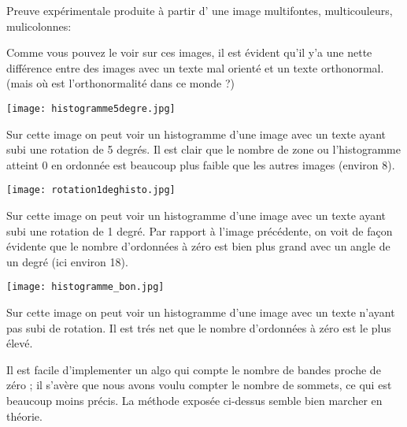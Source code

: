 \documentclass[a4paper,10pt]{report}
\begin{document}
Preuve exp\'erimentale produite \`a partir d' une image multifontes,
multicouleurs, mulicolonnes:

 Comme vous pouvez le voir sur ces images, il est \'evident qu'il y'a une
 nette diff\'erence entre des images avec un texte mal orient\'e et un
 texte orthonormal. (mais o\`u est l'orthonormalit\'e dans ce monde ?)


\begin{center}
	
	\texttt{[image: histogramme5degre.jpg]}\\
\end{center}


Sur cette image on peut voir un histogramme d'une image avec un
texte ayant subi une rotation de 5 degr\'es. Il est clair que le nombre
de zone ou l'histogramme atteint 0 en ordonn\'ee est beaucoup plus faible
que les autres images (environ 8).


\begin{center}
	
	\texttt{[image: rotation1deghisto.jpg]}\\
\end{center}

Sur cette image on peut voir un histogramme d'une image avec un texte
ayant subi une rotation de 1 degr\'e. Par rapport \`a l'image
pr\'ec\'edente, on voit de fa\c con \'evidente que le nombre d'ordonn\'ees
\`a z\'ero est bien plus grand avec un angle de un degr\'e (ici environ 18).


\begin{center}
	
	\texttt{[image: histogramme\_bon.jpg]}\\
\end{center}

Sur cette image on peut voir un histogramme d'une image avec un texte
n'ayant pas subi de rotation. Il est tr\'es net que le nombre
d'ordonn\'ees \`a z\'ero est le plus \'elev\'e.

Il est facile d'implementer un algo qui compte le nombre de bandes
proche de z\'ero ; il s'av\`ere que nous avons voulu compter le nombre de
sommets, ce qui est beaucoup moins pr\'ecis. La m\'ethode expos\'ee
ci-dessus semble bien marcher en th\'eorie.
\end{document}

